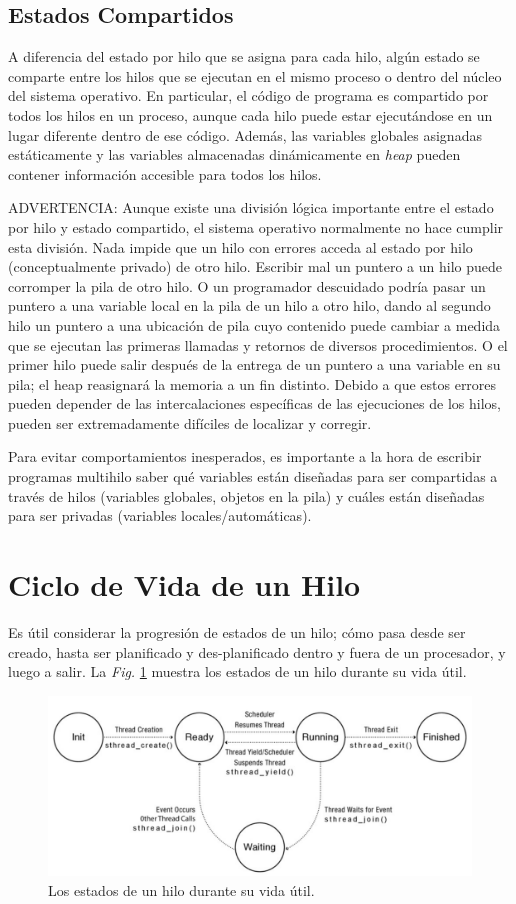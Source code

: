 \documentclass[10pt]{book}
\begin{document}
\subsection{Estados Compartidos}
A diferencia del estado por hilo que se asigna para cada hilo, algún estado se comparte entre los hilos que se ejecutan en el mismo proceso o dentro del núcleo del sistema operativo. En particular, el código de programa es compartido por todos los hilos en un proceso, aunque cada hilo puede estar ejecutándose en un lugar diferente dentro de ese código. Además, las variables globales asignadas estáticamente y las variables almacenadas dinámicamente en \textit{heap} pueden contener información accesible para todos los hilos.

ADVERTENCIA: Aunque existe una división lógica importante entre el estado por hilo y estado compartido, el sistema operativo normalmente no hace cumplir esta división. Nada impide que un hilo con errores acceda al estado por hilo (conceptualmente privado) de otro hilo. Escribir mal un puntero a un hilo puede corromper la pila de otro hilo. O un programador descuidado podría pasar un puntero a una variable local en la pila de un hilo a otro hilo, dando al segundo hilo un puntero a una ubicación de pila cuyo contenido puede cambiar a medida que se ejecutan las primeras llamadas y retornos de diversos procedimientos. O el primer hilo puede salir después de la entrega de un puntero a una variable en su pila; el heap reasignará la memoria a un fin distinto. Debido a que estos errores pueden depender de las intercalaciones específicas de las ejecuciones de los hilos, pueden ser extremadamente difíciles de localizar y corregir.

Para evitar comportamientos inesperados, es importante a la hora de escribir programas multihilo saber qué variables están diseñadas para ser compartidas a través de hilos (variables globales, objetos en la pila) y cuáles están diseñadas para ser privadas (variables locales/automáticas).

\section{Ciclo de Vida de un Hilo}
Es útil considerar la progresión de estados de un hilo; cómo pasa desde ser creado, hasta ser planificado y des-planificado dentro y fuera de un procesador, y luego a salir. La \textit{Fig.} \ref{fig0403} muestra los estados de un hilo durante su vida útil.
\begin{figure}[tbhp]
\centerline{\includegraphics[scale=0.50]{img/fig0403}}
\caption{Los estados de un hilo durante su vida útil.}
\label{fig0403}
\end{figure}
\end{document}
